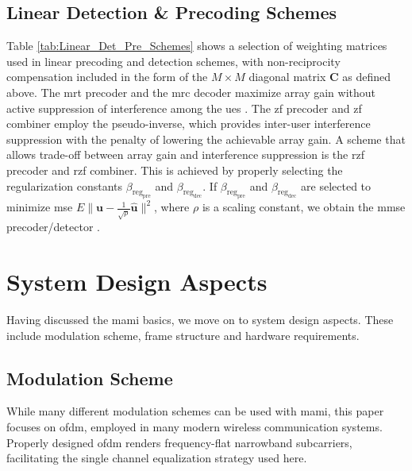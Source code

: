 \documentclass[journal]{IEEEtran}
\begin{document}
%
%
%
%

%

%


%



\subsection{Linear Detection \& Precoding Schemes}
%
%
%

%
Table \ref{tab:Linear_Det_Pre_Schemes} shows a selection of weighting matrices used in linear precoding and detection schemes, with non-reciprocity compensation included in the form of the $M \times M$ diagonal matrix $\bm{C}$ as defined above.
The \gls{mrt} precoder and the \gls{mrc} decoder maximize array gain without active suppression of interference among the \glspl{ue} \cite{Marzetta2010}.
The \gls{zf} precoder and \gls{zf} combiner employ the pseudo-inverse, which provides inter-user interference suppression with the penalty of lowering the achievable array gain.
A scheme that allows trade-off between array gain and interference suppression is the \gls{rzf} precoder and \gls{rzf} combiner.
This is achieved by properly selecting the regularization constants $\beta_{\mathrm{reg}_\mathrm{pre}}$ and $\beta_{\mathrm{reg}_\mathrm{dec}}$.
If $\beta_{\mathrm{reg}_\mathrm{pre}}$ and $\beta_{\mathrm{reg}_\mathrm{dec}}$ are selected to minimize \gls{mse} $E{\|\bm{u} - \tfrac{1}{\sqrt{\rho}}\hat{\bm{u}}\|^2}$, where $\rho$ is a scaling constant, we obtain the \gls{mmse} precoder/detector \cite{Bjoernson2014a}.
%
%


\section{System Design Aspects}
\label{sec:System_Design_Aspect}
%
%
%
%

Having discussed the \gls{mami} basics, we move on to system design aspects.
These include modulation scheme, frame structure and hardware requirements.
%

\subsection{Modulation Scheme} 
While many different modulation schemes can be used with \gls{mami}, this paper focuses on \gls{ofdm}, employed in many modern wireless communication systems.
Properly designed \gls{ofdm} renders frequency-flat narrowband subcarriers, facilitating the single channel equalization strategy used here.
%
%
\end{document}
